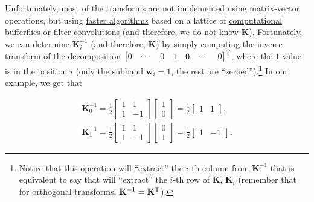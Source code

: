 Unfortunately, most of the transforms are not implemented using
matrix-vector operations, but using
\href{https://en.wikipedia.org/wiki/Fast_Fourier_transform}{faster
  algorithms} based on a lattice of
\href{https://en.wikipedia.org/wiki/Butterfly_diagram}{computational
  bufferflies} or filter
\href{https://en.wikipedia.org/wiki/Filter_(signal_processing)}{convolutions}
(and therefore, we do not know ${\mathbf K}$). Fortunately, we can
determine ${\mathbf K}_i^{-1}$ (and therefore, ${\mathbf K}$) by simply computing the inverse transform of
the decomposition
$\begin{bmatrix} 0 & \cdots & 0 & 1 & 0 & \cdots &
  0 \end{bmatrix}^{\text T}$, where the $1$ value is in the position
$i$ (only the subband ${\mathbf w}_i=1$, the rest are
``zeroed'').\footnote{Notice that this operation will ``extract'' the
  $i$-th column from ${\mathbf K}^{-1}$ that is equivalent to say that
  will ``extract'' the $i$-th row of ${\mathbf K}$, ${\mathbf K}_i$
  (remember that for orthogonal transforms,
  ${\mathbf K}^{-1}={\mathbf K}^{\text T}$).} In our example, we get
that

\begin{equation}
  \begin{array}{l}
    {\mathbf K}_0^{-1} = \frac{1}{2}
    \begin{bmatrix}
      1 & 1 \\
      1 & -1
    \end{bmatrix} 
          \begin{bmatrix}
            1 \\
            0
          \end{bmatrix}
    =  \frac{1}{2}
    \begin{bmatrix}
      1 & 1
    \end{bmatrix},
    \\
    {\mathbf K}_1^{-1} =  \frac{1}{2}
    \begin{bmatrix}
      1 & 1 \\
      1 & -1
    \end{bmatrix}
          \begin{bmatrix}
            0 \\
            1
          \end{bmatrix}
    =  \frac{1}{2}
    \begin{bmatrix}
      1 & -1
    \end{bmatrix}.
  \end{array}
\end{equation}

